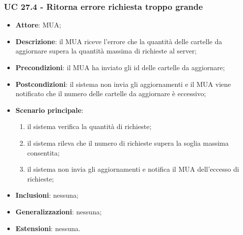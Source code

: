     \subsubsection{UC 27.4 - Ritorna errore richiesta troppo grande} \label{sec:UC27.4}
    \begin{itemize}
        \item \textbf{Attore}: MUA;
        \item \textbf{Descrizione}: il MUA riceve l'errore che la quantità delle cartelle da aggiornare supera la quantità massima di richieste al server;
        \item \textbf{Precondizioni}: il MUA ha inviato gli id delle cartelle da aggiornare;
        \item \textbf{Postcondizioni}: il sistema non invia gli aggiornamenti e il MUA viene notificato che il numero delle cartelle da aggiornare è eccessivo;
        \item \textbf{Scenario principale}:
            \begin{enumerate}
                \item il sistema verifica la quantità di richieste;
                \item il sistema rileva che il numero di richieste supera la soglia massima consentita;
                \item il sistema non invia gli aggiornamenti e notifica il MUA dell'eccesso di richieste;
            \end{enumerate}
        \item \textbf{Inclusioni}: nessuna;
        \item \textbf{Generalizzazioni}: nessuna;
        \item \textbf{Estensioni}: nessuna.
    \end{itemize}

